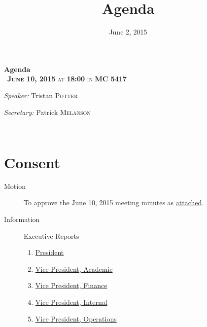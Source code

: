 \documentclass[12pt, letterpaper]{article}
\title{Agenda}
\date{June 2, 2015}
\newcommand{\meetingDate}{June 10, 2015}
\newcommand{\meetingTime}{18:00}
\newcommand{\meetingLocation}{MC 5417}
\begin{document}
\hypersetup{} %


\begin{center}
{ \huge \bfseries Agenda \\[0.4cm] }
{\textsc{~\textbf{\meetingDate} at \textbf{\meetingTime} in \textbf{\meetingLocation}}}
\\[0.2cm]

\begin{minipage}[t]{0.5\textwidth}
\begin{flushleft} \large
\emph{Speaker:}
Tristan \textsc{Potter}
\end{flushleft}
\end{minipage}%
\begin{minipage}[t]{0.5\textwidth}
\begin{flushright} \large
\emph{Secretary:} 
Patrick \textsc{Melanson}
\end{flushright}
\end{minipage}

\HRule \\[0.4cm]
\end{center}

\section*{Consent}
\begin{description}
	\item[Motion] To approve the June 10, 2015 meeting minutes as \hyperref[minutes]{attached}.
	\item[Information] Executive Reports
	\begin{enumerate}
		\item \hyperref[president]{President}
		\item \hyperref[vpacademic]{Vice President, Academic}
		\item \hyperref[vpfinance]{Vice President, Finance}
		\item \hyperref[vpinternal]{Vice President, Internal}
		\item \hyperref[vpoperations]{Vice President, Operations}
	\end{enumerate}
\end{description}
\HRule
\end{document}
